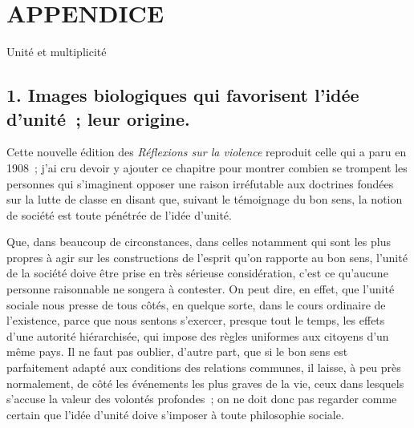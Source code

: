 \documentclass[french,twoside]{book} %
\begin{document}
  \section[{APPENDICE}]{APPENDICE}
\label{p35}\renewcommand{\leftmark}{APPENDICE}

\begin{center}Unité et multiplicité\end{center}
\subsection[{1. Images biologiques qui favorisent l’idée d’unité ; leur origine.}]{1. Images biologiques qui favorisent l’idée d’unité ; leur origine.}
\label{p36}
\noindent Cette nouvelle édition des \emph{Réflexions sur la violence} reproduit celle qui a paru en 1908 ; j’ai cru devoir y ajouter ce chapitre pour montrer combien se trompent les personnes qui s’imaginent opposer une raison irréfutable aux doctrines fondées sur la lutte de classe en  disant que, suivant le témoignage du bon sens, la notion de société est toute pénétrée de l’idée d’unité.\par
Que, dans beaucoup de circonstances, dans celles notamment qui sont les plus propres à agir sur les constructions de l’esprit qu’on rapporte au bon sens, l’unité de la société doive être prise en très sérieuse considération, c’est ce qu’aucune personne raisonnable ne songera à contester. On peut dire, en effet, que l’unité sociale nous presse de tous côtés, en quelque sorte, dans le cours ordinaire de l’existence, parce que nous sentons s’exercer, presque tout le temps, les effets d’une autorité hiérarchisée, qui impose des règles uniformes aux citoyens d’un même pays. Il ne faut pas oublier, d’autre part, que si le bon sens est parfaitement adapté aux conditions des relations communes, il laisse, à peu près normalement, de côté les événements les plus graves de la vie, ceux dans lesquels s’accuse la valeur des volontés profondes ; on ne doit donc pas regarder comme certain que l’idée d’unité doive s’imposer à toute philosophie sociale.\par
\end{document}
